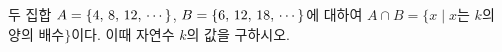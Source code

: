두 집합 $A=\{4,\mkern3mu 8,\mkern3mu 12,\mkern3mu \cdots\}$, $B=\{6,\mkern3mu 12,\mkern3mu 18,\mkern3mu \cdots\}$에 대하여 $A\cap B=\{x \mid x$는 $k$의 양의 배수$\}$이다. 이때 자연수 $k$의 값을 구하시오.

